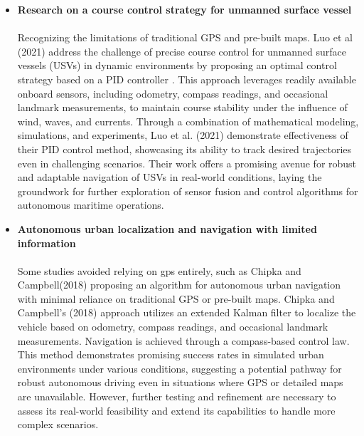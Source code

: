 \begin{itemize}
  \item {\bf Research on a course control strategy for unmanned surface vessel}
  \paragraph{} Recognizing the limitations of traditional GPS and pre-built maps. Luo et al (2021) address the challenge of precise 
              course control for unmanned surface vessels (USVs) in dynamic environments by proposing an optimal control strategy 
              based on a PID controller . This approach leverages readily available onboard sensors, including odometry, compass 
              readings, and occasional landmark measurements, to maintain course stability under the influence of wind, waves, and 
              currents. Through a combination of mathematical modeling, simulations, and experiments, Luo et al. (2021) demonstrate 
              effectiveness of their PID control method, showcasing its ability to track desired trajectories even in challenging 
              scenarios. Their work offers a promising avenue for robust and adaptable navigation of USVs in real-world conditions, 
              laying the groundwork for further exploration of sensor fusion and control algorithms for autonomous maritime operations.

  \item {\bf Autonomous urban localization and navigation with limited information}
  \paragraph{} Some studies avoided relying on gps entirely, such as Chipka and Campbell(2018) proposing an algorithm for autonomous 
              urban navigation with minimal reliance on traditional GPS or pre-built maps. Chipka and Campbell’s (2018) approach 
              utilizes an extended Kalman filter to localize the vehicle based on odometry, compass readings, and occasional landmark 
              measurements. Navigation is achieved through a compass-based control law. This method demonstrates promising success 
              rates in simulated urban environments under various conditions, suggesting a potential pathway for robust autonomous 
              driving even in situations where GPS or detailed maps are unavailable. However, further testing and refinement are 
              necessary to assess its real-world feasibility and extend its capabilities to handle more complex scenarios.


\end{itemize}
